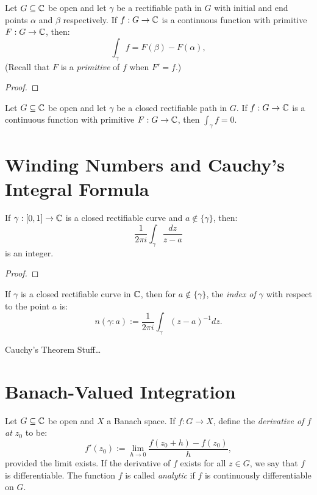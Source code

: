 \begin{theorem}
	Let $G \subseteq \mathbb{C}$ be open and let $\gamma$ be a rectifiable path in $G$ with initial and end points $\alpha$ and $\beta$ respectively. If $f:G \rightarrow \mathbb{C}$ is a continuous function with primitive $F:G \rightarrow \mathbb{C}$, then:
	\[
		\int_{\gamma}^{}f  = F(\beta)-F(\alpha),
	\] 
	(Recall that $F$ is a \emph{primitive} of $f$ when $F' = f$.)
\end{theorem}
{\color{red}
\begin{proof}
		
\end{proof}}

\begin{corollary}
	Let $G \subseteq \mathbb{C}$ be open and let $\gamma$ be a closed rectifiable path in $G$. If $f:G \rightarrow \mathbb{C}$ is a continuous function with primitive $F:G \rightarrow \mathbb{C}$, then $\int_{\gamma}^{} f = 0$.
\end{corollary}

\section{Winding Numbers and Cauchy's Integral Formula}

\begin{proposition}
	If $\gamma:[0,1] \rightarrow \mathbb{C}$ is a closed rectifiable curve and $a \not\in \{\gamma\}$, then:
	\[
		\frac{1}{2\pi i}\int_{\gamma}^{} \frac{dz}{z-a}
	\] 
	is an integer.
\end{proposition}
{\color{red}
\begin{proof}
		
\end{proof}}

\begin{definition}
	If $\gamma$ is a closed rectifiable curve in $\mathbb{C}$, then for $a \not\in \{\gamma\}$, the \emph{index of $\gamma$} with respect to the point $a$ is:
	\[
		n(\gamma : a) := \frac{1}{2\pi i} \int_{\gamma}^{} (z-a)^{-1}dz. 
	\] 
\end{definition}

{\color{red} Cauchy's Theorem Stuff\ldots}

\section{Banach-Valued Integration}

\begin{definition}
	Let $G \subseteq \mathbb{C}$ be open and $X$ a Banach space. If $f:G \rightarrow X$, define the \emph{derivative of $f$ at $z_0$} to be:
	\[
		f'(z_0) := \lim_{h \rightarrow 0}\frac{f(z_0 + h) - f(z_0)}{h},
	\] 
	provided the limit exists. If the derivative of $f$ exists for all $z \in G$, we say that $f$ is differentiable. The function $f$ is called \emph{analytic} if $f$ is continuously differentiable on $G$.
\end{definition}

